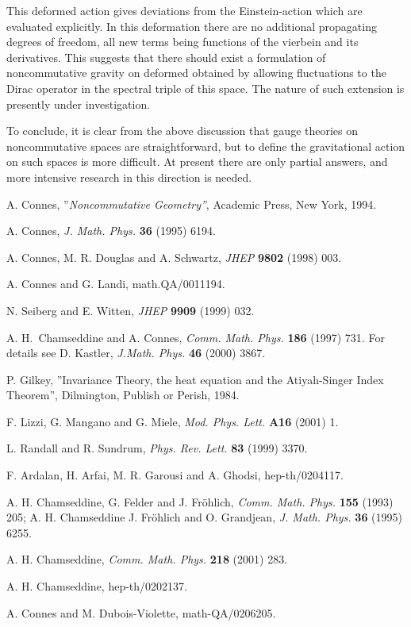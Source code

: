 \documentclass[a4paper,12pt]{article}
\begin{document}
This deformed action gives deviations from the Einstein-action which are
evaluated explicitly. In this deformation there are no additional propagating
degrees of freedom, all new terms being functions of the vierbein \coordHE{} and its derivatives. This suggests that there should exist a formulation
of noncommutative gravity on deformed \coordHE{} obtained by allowing
fluctuations to the Dirac operator in the spectral triple of this space. The
nature of such extension is presently under investigation.

To conclude, it is clear from the above discussion that gauge theories on
noncommutative spaces are straightforward, but to define the gravitational
action on such spaces is more difficult. At present there are only partial
answers, and more intensive research in this direction is needed.

\begin{thebibliography}{99}
A. Connes, ''\textit{Noncommutative Geometry''}, Academic Press,
New York, 1994.

A. Connes, \textit{J. Math. Phys. }\textbf{36 }(1995) 6194.

A. Connes, M. R. Douglas and A. Schwartz, \textit{JHEP
}\textbf{9802 }(1998) 003.

A. Connes and G. Landi, math.QA/0011194.

N. Seiberg and E. Witten, \textit{JHEP }\textbf{9909 }(1999) 032.

A. H.\ Chamseddine and A. Connes, \textit{Comm. Math. Phys.
}\textbf{186 }(1997) 731. For details see D. Kastler, \textit{J.Math. Phys.
}\textbf{46 }(2000) 3867.

P. Gilkey, ''Invariance Theory, the heat equation and the
Atiyah-Singer Index Theorem'', Dilmington, Publish or Perish, 1984.

F. Lizzi, G. Mangano and G. Miele, \textit{Mod. Phys. Lett.
}\textbf{A16 }(2001) 1.

L. Randall and R. Sundrum, \textit{Phys. Rev. Lett. }\textbf{83
}(1999) 3370.

F. Ardalan, H. Arfai, M. R. Garousi and A. Ghodsi, hep-th/0204117.

A. H. Chamseddine, G. Felder and J. Fr\"{o}hlich, \textit{Comm.
Math. Phys. }\textbf{155 }(1993) 205; A. H. Chamseddine J. Fr\"{o}hlich and O.
Grandjean, \textit{J. Math. Phys. }\textbf{36 }(1995) 6255.

A. H. Chamseddine, \textit{Comm. Math. Phys. }\textbf{218
}(2001) 283.

A. H. Chamseddine, hep-th/0202137.

A. Connes and M. Dubois-Violette, math-QA/0206205.
\end{thebibliography}
\end{document}
